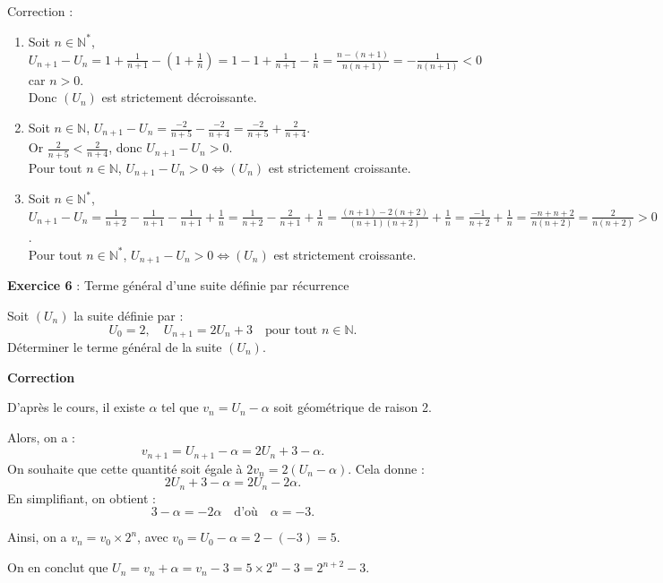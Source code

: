 \documentclass[a4paper, 12pt]{article}
\begin{document}
Correction :
\begin{enumerate}
    \item Soit \(n \in \mathbb{N}^*\), \(U_{n+1} - U_n = 1 + \frac{1}{n+1} - \left(1 + \frac{1}{n}\right) = 1 - 1 + \frac{1}{n+1} - \frac{1}{n} = \frac{n - (n+1)}{n(n+1)} = -\frac{1}{n(n+1)} < 0\) car \(n > 0\). \\
    Donc \((U_n)\) est strictement décroissante.
    
    \item Soit \(n \in \mathbb{N}\), \(U_{n+1} - U_n = \frac{-2}{n+5} - \frac{-2}{n+4} = \frac{-2}{n+5} + \frac{2}{n+4}\). \\
    Or \(\frac{2}{n+5} < \frac{2}{n+4}\), donc \(U_{n+1} - U_n > 0\). \\
    Pour tout \(n \in \mathbb{N}\), \(U_{n+1} - U_n > 0 \iff (U_n)\) est strictement croissante.

    \item Soit \(n \in \mathbb{N}^*\), \(U_{n+1} - U_n = \frac{1}{n+2} - \frac{1}{n+1} - \frac{1}{n+1} + \frac{1}{n} = \frac{1}{n+2} - \frac{2}{n+1} + \frac{1}{n} = \frac{(n+1) - 2(n+2)}{(n+1)(n+2)} + \frac{1}{n} = \frac{-1}{n+2} + \frac{1}{n} = \frac{-n + n + 2}{n(n+2)} = \frac{2}{n(n+2)} > 0\). \\
    Pour tout \(n \in \mathbb{N}^*\), \(U_{n+1} - U_n > 0 \iff (U_n)\) est strictement croissante.
\end{enumerate}

\textbf{Exercice 6} : Terme général d'une suite définie par récurrence

Soit \((U_n)\) la suite définie par :
\[
U_0 = 2, \quad U_{n+1} = 2U_n + 3 \quad \text{pour tout } n \in \mathbb{N}.
\]
Déterminer le terme général de la suite \((U_n)\).

\textbf{Correction}

D'après le cours, il existe \(\alpha\) tel que \(v_n = U_n - \alpha\) soit géométrique de raison 2. 

Alors, on a :
\[
v_{n+1} = U_{n+1} - \alpha = 2U_n + 3 - \alpha.
\]
On souhaite que cette quantité soit égale à \(2v_n = 2(U_n - \alpha)\). Cela donne :
\[
2U_n + 3 - \alpha = 2U_n - 2\alpha.
\]
En simplifiant, on obtient :
\[
3 - \alpha = -2\alpha \quad \text{d'où} \quad \alpha = -3.
\]

Ainsi, on a \(v_n = v_0 \times 2^n\), avec \(v_0 = U_0 - \alpha = 2 - (-3) = 5\).

On en conclut que \(U_n = v_n + \alpha = v_n - 3 = 5 \times 2^n - 3 = 2^{n+2} - 3\).
\end{document}
